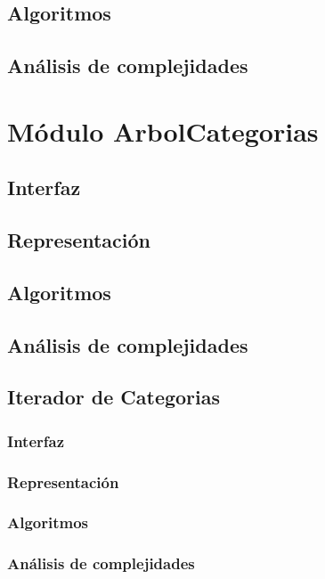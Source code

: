 \documentclass[12pt, a4paper]{article}
\begin{document}
\subsection{Algoritmos}

\subsection{Análisis de complejidades}

\newpage

\section{Módulo ArbolCategorias} 
\subsection{Interfaz}

\subsection{Representaci\'on}

\subsection{Algoritmos}

\subsection{Análisis de complejidades}

\newpage

\subsection{Iterador de Categorias} 
\subsubsection{Interfaz}

\subsubsection{Representaci\'on}

\subsubsection{Algoritmos}

\subsubsection{Análisis de complejidades}

\newpage
\end{document}
